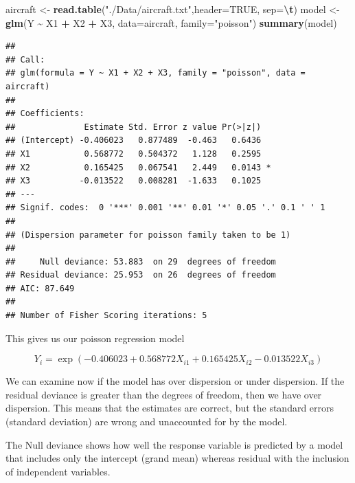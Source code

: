\documentclass[
  11pt,
]{article}
\newenvironment{Shaded}{\begin{snugshade}}{\end{snugshade}}
\newcommand{\AttributeTok}[1]{\textcolor[rgb]{0.13,0.29,0.53}{#1}}
\newcommand{\ConstantTok}[1]{\textcolor[rgb]{0.56,0.35,0.01}{#1}}
\newcommand{\FunctionTok}[1]{\textcolor[rgb]{0.13,0.29,0.53}{\textbf{#1}}}
\newcommand{\NormalTok}[1]{#1}
\newcommand{\OtherTok}[1]{\textcolor[rgb]{0.56,0.35,0.01}{#1}}
\newcommand{\SpecialCharTok}[1]{\textcolor[rgb]{0.81,0.36,0.00}{\textbf{#1}}}
\newcommand{\StringTok}[1]{\textcolor[rgb]{0.31,0.60,0.02}{#1}}
\begin{document}
\begin{Shaded}
\begin{Highlighting}[]
\NormalTok{aircraft }\OtherTok{\textless{}{-}} \FunctionTok{read.table}\NormalTok{(}\StringTok{"./Data/aircraft.txt"}\NormalTok{,}\AttributeTok{header=}\ConstantTok{TRUE}\NormalTok{, }\AttributeTok{sep=}\StringTok{\textquotesingle{}}\SpecialCharTok{\textbackslash{}t}\StringTok{\textquotesingle{}}\NormalTok{)}
\NormalTok{model }\OtherTok{\textless{}{-}} \FunctionTok{glm}\NormalTok{(Y }\SpecialCharTok{\textasciitilde{}}\NormalTok{ X1 }\SpecialCharTok{+}\NormalTok{ X2 }\SpecialCharTok{+}\NormalTok{ X3, }\AttributeTok{data=}\NormalTok{aircraft, }\AttributeTok{family=}\StringTok{"poisson"}\NormalTok{)}
\FunctionTok{summary}\NormalTok{(model)}
\end{Highlighting}
\end{Shaded}

\begin{verbatim}
## 
## Call:
## glm(formula = Y ~ X1 + X2 + X3, family = "poisson", data = aircraft)
## 
## Coefficients:
##              Estimate Std. Error z value Pr(>|z|)  
## (Intercept) -0.406023   0.877489  -0.463   0.6436  
## X1           0.568772   0.504372   1.128   0.2595  
## X2           0.165425   0.067541   2.449   0.0143 *
## X3          -0.013522   0.008281  -1.633   0.1025  
## ---
## Signif. codes:  0 '***' 0.001 '**' 0.01 '*' 0.05 '.' 0.1 ' ' 1
## 
## (Dispersion parameter for poisson family taken to be 1)
## 
##     Null deviance: 53.883  on 29  degrees of freedom
## Residual deviance: 25.953  on 26  degrees of freedom
## AIC: 87.649
## 
## Number of Fisher Scoring iterations: 5
\end{verbatim}

This gives us our poisson regression model

\[Y_i = \exp(-0.406023 + 0.568772X_{i1} + 0.165425X_{i2} -0.013522X_{i3} )\]

We can examine now if the model has over dispersion or under dispersion.
If the residual deviance is greater than the degrees of freedom, then we
have over dispersion. This means that the estimates are correct, but the
standard errors (standard deviation) are wrong and unaccounted for by
the model.

The Null deviance shows how well the response variable is predicted by a
model that includes only the intercept (grand mean) whereas residual
with the inclusion of independent variables.
\end{document}
